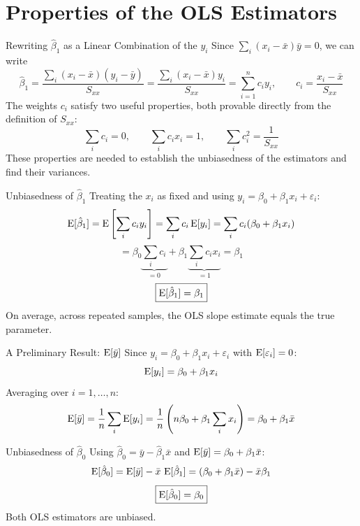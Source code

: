 \section{Properties of the OLS Estimators}


\begin{frame}{Rewriting $\hat\beta_1$ as a Linear Combination of the $y_i$}
	Since $\sum_i (x_i - \bar x)\bar y = 0$, we can write
	\[
		\hat\beta_1 = \frac{\sum_i (x_i - \bar x)(y_i - \bar y)}{S_{xx}} = \frac{\sum_i (x_i - \bar x) y_i}{S_{xx}} = \sum_{i=1}^n c_i y_i, \qquad c_i = \frac{x_i - \bar x}{S_{xx}}
	\]
	\pause
	The weights $c_i$ satisfy two useful properties, both provable directly from the definition of $S_{xx}$:
	\[
		\sum_i c_i = 0, \qquad \sum_i c_i x_i = 1, \qquad \sum_i c_i^2 = \frac{1}{S_{xx}}
	\]
	These properties are needed to establish the unbiasedness of the estimators and find their variances.
\end{frame}


\begin{frame}{Unbiasedness of $\hat\beta_1$}
	Treating the $x_i$ as fixed and using $y_i = \beta_0 + \beta_1 x_i + \varepsilon_i$:
	\[
		\operatorname{E}[\hat\beta_1] = \operatorname{E}\left[\sum_i c_i y_i\right] = \sum_i c_i \operatorname{E}[y_i] = \sum_i c_i(\beta_0 + \beta_1 x_i)
	\]
	\pause
	\[
		= \beta_0 \underbrace{\sum_i c_i}_{=0} + \beta_1 \underbrace{\sum_i c_i x_i}_{=1} = \beta_1
	\]
	\pause
	\[
		\boxed{\operatorname{E}[\hat\beta_1] = \beta_1}
	\]
	On average, across repeated samples, the OLS slope estimate equals the true parameter.
\end{frame}


\begin{frame}{A Preliminary Result: $\operatorname{E}[\bar y]$}
	Since $y_i = \beta_0 + \beta_1 x_i + \varepsilon_i$ with $\operatorname{E}[\varepsilon_i] = 0$:
	\[
		\operatorname{E}[y_i] = \beta_0 + \beta_1 x_i
	\]
	\pause
	Averaging over $i = 1, \dots, n$:
	\[
		\operatorname{E}[\bar y] = \frac{1}{n}\sum_i \operatorname{E}[y_i] = \frac{1}{n}\left(n\beta_0 + \beta_1\sum_i x_i\right) = \beta_0 + \beta_1\bar x
	\]
\end{frame}


\begin{frame}{Unbiasedness of $\hat\beta_0$}
	Using $\hat\beta_0 = \bar y - \hat\beta_1 \bar x$ and $\operatorname{E}[\bar y] = \beta_0 + \beta_1 \bar x$:
	\[
		\operatorname{E}[\hat\beta_0] = \operatorname{E}[\bar y] - \bar x\, \operatorname{E}[\hat\beta_1] = (\beta_0 + \beta_1 \bar x) - \bar x \beta_1
	\]
	\pause
	\[
		\boxed{\operatorname{E}[\hat\beta_0] = \beta_0}
	\]
	Both OLS estimators are unbiased.
\end{frame}


